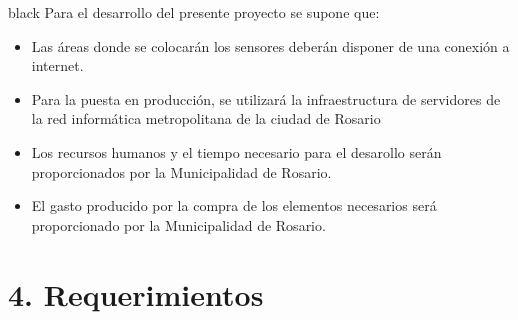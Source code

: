 \documentclass[11pt]{charter}
\begin{document}
\begin{consigna}{black}
Para el desarrollo del presente proyecto se supone que:

\begin{itemize}
\item Las áreas donde se colocarán los sensores deberán disponer de una conexión a internet.
\item Para la puesta en producción, se utilizará la infraestructura de servidores de la red informática metropolitana de la ciudad de Rosario
\item Los recursos humanos y el tiempo necesario para el desarollo serán proporcionados por la Municipalidad de Rosario.
\item El gasto producido por la compra de los elementos necesarios será proporcionado por la Municipalidad de Rosario.
\end{itemize}

\end{consigna}

\section{4. Requerimientos}
\label{sec:requerimientos}
\end{document}

